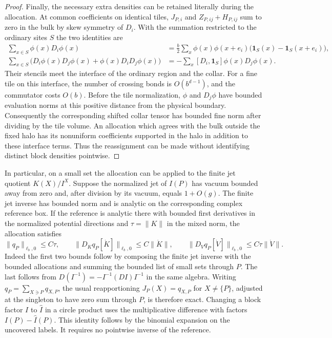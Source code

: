 \documentclass[11pt]{article}
\theoremstyle{definition}
\begin{document}
\begin{proof}
Finally, the necessary extra densities can be retained literally
during the allocation. At common coefficients on identical tiles,
\(J_{P,i}\) and \(Z_{P,ij}+H_{P,ij}\) sum to zero in the bulk
by skew symmetry of \(D_i\). With the summation restricted
to the ordinary sites \(S\) the two identities are
\begin{equation}
 \begin{aligned}
 \sum_{x\in S}\phi(x)D_i\phi(x)
   &=\tfrac b2\sum_x \phi(x)\phi(x+e_i)
                       \bigl(\mathbf1_S(x)-\mathbf1_S(x+e_i)\bigr),\\[2pt]
 \sum_{x\in S}\bigl(D_i\phi(x)D_j\phi(x)
                      +\phi(x)D_iD_j\phi(x)\bigr)
   &=-\sum_x [D_i,\mathbf1_S]\phi(x)D_j\phi(x).
 \end{aligned}
\end{equation}
Their stencils meet the interface of the ordinary region
and the collar. For a fine tile on this interface, the
number of crossing bonds is \(O(b^{d-1})\), and the
commutator costs \(O(b)\). Before the tile normalization,
\(\phi\) and \(D_j\phi\) have bounded evaluation norms
at this positive distance from the physical boundary.
Consequently the corresponding shifted collar tensor has
bounded fine norm after dividing by the tile volume.
An allocation which agrees with the bulk outside the
fixed halo has its nonuniform coefficients supported in
the halo in addition to these interface terms. Thus the
reassignment can be made without identifying distinct
block densities pointwise.
\end{proof}

In particular, on a small set the allocation can be applied to
the finite jet quotient \(K(X)/I^X\). Suppose the normalized
jet of \(I(P)\) has vacuum bounded away from zero and, after
division by its vacuum, equals \(1+O(g)\). The finite jet
inverse has bounded norm and is analytic on the corresponding
complex reference box. If the reference is analytic there
with bounded first derivatives in the normalized potential
directions and \(\tau=\|K\|\) in the mixed norm, the allocation
satisfies
\begin{equation}
 \|q_P\|_{\ell_b,0}\le C\tau,\qquad
 \|D_Kq_P[\dot K]\|_{\ell_b,0}\le C\|\dot K\|,\qquad
 \|D_Vq_P[\dot V]\|_{\ell_b,0}\le C\tau\|\dot V\| .
\end{equation}
Indeed the first two bounds follow by composing the finite
jet inverse with the bounded allocations and summing the
bounded list of small sets through \(P\). The last follows
from \(D(I^{-1})=-I^{-1}(D I)I^{-1}\) in the same algebra.
Writing \(q_P=\sum_{X\ni P}q_{X,P}\), the usual reapportioning
\(J_P(X)=q_{X,P}\) for \(X\ne\{P\}\), adjusted at the singleton
to have zero sum through \(P\), is therefore exact. Changing
a block factor \(I\) to \(\widehat I\) in a circle product
uses the multiplicative difference with factors
\(I(P)-\widehat I(P)\). This identity follows by the binomial
expansion on the uncovered labels. It requires no pointwise
inverse of the reference.
\end{document}
